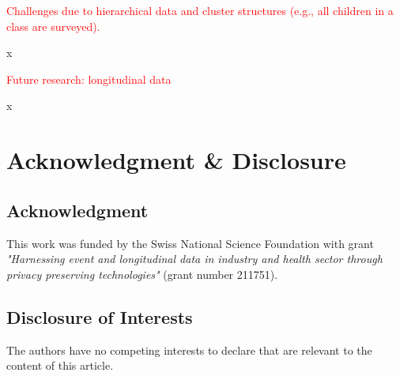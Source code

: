 \documentclass{article}
\begin{document}
\textcolor{red}{Challenges due to hierarchical data and cluster structures (e.g., all children in a class are surveyed).}

x

\textcolor{red}{Future research: longitudinal data}

x

\section*{Acknowledgment \& Disclosure} 
\subsection*{Acknowledgment} 
This work was funded by the Swiss National Science Foundation with grant \textit{"Harnessing event and longitudinal data in industry and health sector through privacy preserving technologies"} (grant number 211751).

\subsection*{Disclosure of Interests} 
The authors have no competing interests to declare that are relevant to the content of this article. 




\end{document}
